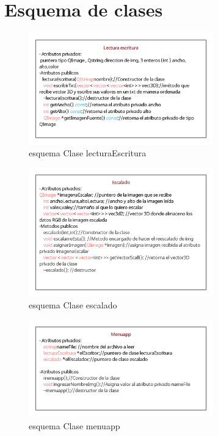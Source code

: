 \documentclass{article}
\begin{document}
\section{Esquema de clases}
\begin{figure}[h]
\includegraphics[width=8cm]{resources/esquemaLecturaEscritura.png}
\centering

\caption{esquema Clase lecturaEscritura}
\label{fig:RAMM}
\end{figure}
\begin{figure}[h]
\includegraphics[width=8cm]{resources/esquemaEscalado.png}
\centering

\caption{esquema Clase escalado}
\end{figure}
\begin{figure}[h]
\includegraphics[width=8cm]{resources/esquemaMenuapp.png}
\centering

\caption{esquema Clase menuapp}
\end{figure}

\newpage
\end{document}
